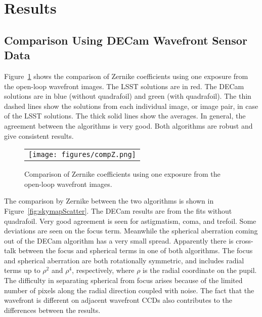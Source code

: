 \documentclass[]{spie}  %
\begin{document}
\section{Results}
\label{sec:results}

\subsection{Comparison Using DECam Wavefront Sensor Data}

Figure~\ref{fig:compZ} shows the comparison of Zernike coefficients using one exposure from the open-loop wavefront images. The LSST solutions are in red. The DECam solutions are in blue (without quadrafoil) and green (with quadrafoil). The thin dashed lines show the solutions from each individual image, or image pair, in case of the LSST solutions. The thick solid lines show the averages. In general, the agreement between the algorithms is very good. Both algorithms are robust and give consistent results.

   \begin{figure} [tphb]
   \begin{center}
   \begin{tabular}{c} %
   \texttt{[image: figures/compZ.png]}
   \end{tabular}
   \end{center}
   \caption[example] 
   { \label{fig:compZ} 
Comparison of Zernike coefficients using one exposure from the open-loop wavefront images. 
}
   \end{figure} 

The comparison by Zernike between the two algorithms is shown in
Figure~\ref{fig:skymapScatter}. The DECam results are from the fits without quadrafoil. 
Very good agreement is seen for astigmatism, coma, and trefoil.
Some deviations are seen on the focus term.
Meanwhile the spherical aberration coming out of the DECam algorithm has a very small spread.
Apparently there is cross-talk between the focus and spherical terms in one of both algorithms.
The focus and spherical aberration are both rotationally symmetric, and includes radial terms up to $\rho^2$ and $\rho^4$, respectively, where $\rho$ is the radial coordinate on the pupil. 
The difficulty in separating spherical from focus arises because of the limited number of pixels along the radial direction coupled with noise.
The fact that the wavefront is different on adjacent wavefront CCDs also contributes to the differences between the results.
\end{document}
